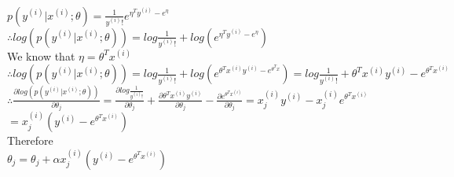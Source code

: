 \begin{answer}\\
$p(y^{(i)}|x^{(i)};\theta)=\frac{1}{y^{(i)}!}e^{\eta^Ty^{(i)}-e^{\eta}}$\\
$\therefore log (p(y^{(i)}|x^{(i)};\theta))=log \frac{1}{y^{(i)}!}+ log (e^{\eta^Ty^{(i)}-e^{\eta}})$\\
We know that $\eta=\theta^T x^{(i)}$\\
$\therefore log (p(y^{(i)}|x^{(i)};\theta))=log \frac{1}{y^{(i)}!}+ log (e^{\theta^Tx^{(i)}y^{(i)}-e^{\theta^Tx}})=log \frac{1}{y^{(i)}!}+\theta^Tx^{(i)}y^{(i)}-e^{\theta^Tx^{(i)}}$\\
$\therefore \frac{\partial log (p(y^{(i)}|x^{(i)};\theta))}{\partial \theta_j}=\frac{\partial log \frac{1}{y^{(i)}!}}{\partial \theta_j}+\frac{\partial \theta^Tx^{(i)}y^{(i)}}{\partial \theta_j}-\frac{\partial e^{\theta^Tx^{(i)}}}{\partial \theta_j}=x_j^{(i)}y^{(i)}-x_j^{(i)}e^{\theta^Tx^{(i)}}$\\
$=x_j^{(i)}(y^{(i)}-e^{\theta^Tx^{(i)}})$\\
Therefore \\
$\theta_j=\theta_j+\alpha x_j^{(i)}(y^{(i)}-e^{\theta^Tx^{(i)}})$\\ 
\end{answer}
